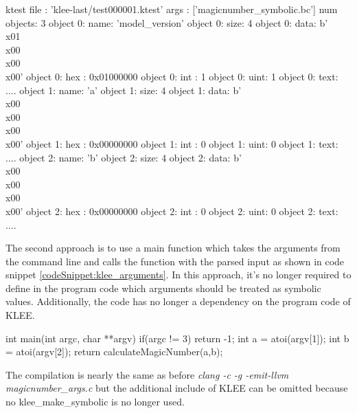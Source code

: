 \begin{codesnippet}[caption={The test case generated by KLEE which triggers the assertion error when executing it on the code snippet \ref{codeSnippet:klee_inline}}, label={codeSnippet:test_case_one}]
ktest file : 'klee-last/test000001.ktest'
args       : ['magicnumber_symbolic.bc']
num objects: 3
object 0: name: 'model_version'
object 0: size: 4
object 0: data: b'\\x01\\x00\\x00\\x00'
object 0: hex : 0x01000000
object 0: int : 1
object 0: uint: 1
object 0: text: ....
object 1: name: 'a'
object 1: size: 4
object 1: data: b'\\x00\\x00\\x00\\x00'
object 1: hex : 0x00000000
object 1: int : 0
object 1: uint: 0
object 1: text: ....
object 2: name: 'b'
object 2: size: 4
object 2: data: b'\\x00\\x00\\x00\\x00'
object 2: hex : 0x00000000
object 2: int : 0
object 2: uint: 0
object 2: text: ....
\end{codesnippet}

The second approach is to use a main function which takes the arguments from the command line and calls the function with the parsed input as shown in code snippet \ref{codeSnippet:klee_arguments}.
In this approach, it's no longer required to define in the program code which arguments should be treated as symbolic values. Additionally, the code has no longer a dependency on the program code of KLEE.

\begin{codesnippet}[caption={Main function which parses two input arguments and calls the function calculateMagicNumber of code snippet \ref{codeSnippet:symbolicExecution}}, label={codeSnippet:klee_arguments}]
int main(int argc, char **argv) {
  if(argc != 3){
	return -1;
  }
  int a = atoi(argv[1]);
  int b = atoi(argv[2]);
  return calculateMagicNumber(a,b);
}
\end{codesnippet}

The compilation is nearly the same as before \textit{clang -c -g -emit-llvm magicnumber\_args.c} but the additional include of KLEE can be omitted because no klee\_make\_symbolic is no longer used.

